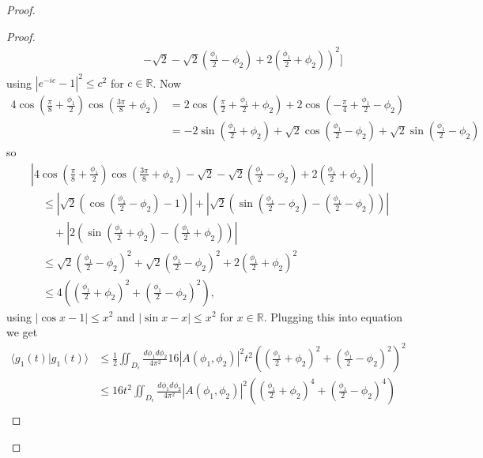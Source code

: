 \documentclass[../thesis-main/thesis-main]{subfiles}
\begin{document}
\begin{proof}
\begin{proof}
\begin{align}
&\qquad\qquad\qquad\left.
 	-\sqrt{2}-\sqrt{2}\left(\frac{\phi_{1}}{2}-\phi_{2}\right)+2\left(\frac{\phi_{1}}{2}+\phi_{2}\right)\right)^{2}\Bigg]
 	\label{eq:g_bound}
\end{align}
using $\left|e^{-ic}-1\right|^{2}\leq c^{2}$ for $c\in\mathbb{R}$.
Now 
\begin{align*}
4\cos\left(\frac{\pi}{8}+\frac{\phi_{1}}{2}\right)\cos\left(\frac{3\pi}{8}+\phi_{2}\right) & =  
	2\cos\left(\frac{\pi}{2}+\frac{\phi_{1}}{2}+\phi_{2}\right)+2\cos\left(-\frac{\pi}{4}+\frac{\phi_{1}}{2}-\phi_{2}\right)\\
 & =  - 2 \sin\left(\frac{\phi_1}{2} + \phi_2\right) + \sqrt{2} \cos\left(\frac{\phi_1}{2}-\phi_2\right) + 
 	\sqrt{2} \sin\left(\frac{\phi_1}{2} - \phi_2\right)
 \end{align*}
so 
\begin{align*}
 &   \left|4\cos\left(\frac{\pi}{8}+\frac{\phi_{1}}{2}\right)\cos\left(\frac{3\pi}{8}+\phi_{2}\right)-\sqrt{2}-\sqrt{2}
 	\left(\frac{\phi_{1}}{2}-\phi_{2}\right)+2\left(\frac{\phi_{1}}{2}+\phi_{2}\right)\right|\\
 & \quad \leq  \left|\sqrt{2}\left(\cos\left(\frac{\phi_{1}}{2}-\phi_{2}\right)-1\right)\right| 
 	+\left|\sqrt{2}\left(\sin\left(\frac{\phi_{1}}{2}-\phi_{2}\right)-\left(\frac{\phi_{1}}{2}-\phi_{2}\right)\right)\right|\\
 & \qquad +\left|2\left(\sin\left(\frac{\phi_{1}}{2}+\phi_{2}\right)-\left(\frac{\phi_{1}}{2}+\phi_{2}\right)\right)\right|\\
 & \quad \leq  \sqrt{2}\left(\frac{\phi_1}{2}-\phi_{2}\right)^{2}+\sqrt{2}\left(\frac{\phi_{1}}{2}
 	-\phi_{2}\right)^{2}+2\left(\frac{\phi_{1}}{2}+\phi_{2}\right)^{2} \\
 & \quad \leq  4\left(\left(\frac{\phi_{1}}{2}+\phi_{2}\right)^{2}+\left(\frac{\phi_{1}}{2}-\phi_{2}\right)^{2}\right),
\end{align*}
using $|{\cos x -1}|\leq x^2$ and $|{\sin x-x}|\leq x^2$ for $x\in \mathbb{R}$. Plugging this into equation  we get 
\begin{align*}
\langle g_{1}(t)|g_{1}(t)\rangle & \leq \frac{1}{2}\iint_{D_{\epsilon}}
	\frac{d\phi_{1}d\phi_{2}}{4\pi^{2}} 16 \left|A(\phi_{1},\phi_{2})\right|^{2}t^{2}
	\left(\left(\frac{\phi_{1}}{2} + \phi_2\right)^2+\left(\frac{\phi_1}{2} - \phi_{2}\right)^2\right)^{2} \\
 & \leq  16 t^2 \iint_{D_{\epsilon}}\frac{d\phi_{1}d\phi_{2}}{4\pi^{2}}
 	\left|A(\phi_{1},\phi_{2})\right|^{2}\left(\left(\frac{\phi_1}{2} + \phi_2\right)^4 
 	+ \left(\frac{\phi_1}{2} - \phi_2\right)^4\right)\\

\end{align*}
\end{proof}
\end{proof}
\end{document}
